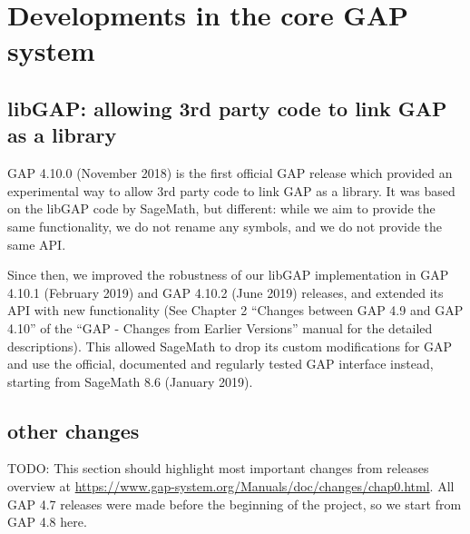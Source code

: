 \documentclass{deliverablereport}
\author{Author names}
\begin{document}
\maketitle
\githubissuedescription



\section{Developments in the core GAP system}

\subsection{libGAP: allowing 3rd party code to link GAP as a library}

GAP 4.10.0 (November 2018) is the first official GAP release
which provided an experimental way to allow 3rd party code to 
link GAP as a library. It was based on the libGAP code by SageMath, 
but different: while we aim to provide the same functionality, 
we do not rename any symbols, and we do not provide the same API. 

Since then, we improved the robustness of our libGAP implementation
in GAP 4.10.1 (February 2019) and GAP 4.10.2 (June 2019) releases,
and extended its API with new functionality (See Chapter 2 
``Changes between GAP 4.9 and GAP 4.10'' of the 
``GAP - Changes from Earlier Versions'' manual for the detailed
descriptions). This allowed SageMath to drop its custom 
modifications for GAP and use the official, documented and regularly 
tested GAP interface instead, starting from SageMath 8.6 (January 2019).

\subsection{other changes}

TODO: This section should highlight most important changes from
releases overview at \url{https://www.gap-system.org/Manuals/doc/changes/chap0.html}.
All GAP 4.7 releases were made before the beginning of the project,
so we start from GAP 4.8 here.
\end{document}
